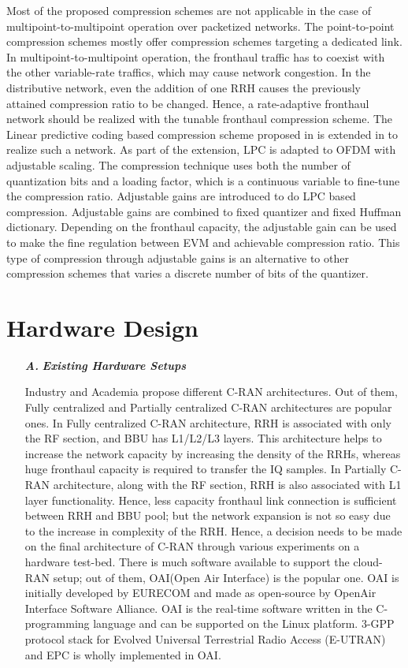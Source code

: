 \begin{multicols}{2}
\begin{itemize}
Most of the proposed compression schemes are not applicable in the case of multipoint-to-multipoint operation over packetized networks. The point-to-point compression schemes mostly offer compression schemes targeting a dedicated link. In multipoint-to-multipoint operation, the fronthaul traffic has to coexist with the other variable-rate traffics, which may cause network congestion. In the distributive network, even the addition of one RRH causes the previously attained compression ratio to be changed. Hence, a rate-adaptive fronthaul network should be realized with the tunable fronthaul compression scheme. The Linear predictive coding based compression scheme proposed in \cite{art3-key71} is extended in \cite{art3-key73} to realize such a network. As part of the extension, LPC is adapted to OFDM with adjustable scaling. The compression technique uses both the number of quantization bits and a loading factor, which is a continuous variable to fine-tune the compression ratio. Adjustable gains are introduced to do LPC based compression. Adjustable gains are combined to fixed quantizer and fixed Huffman dictionary. Depending on the fronthaul capacity, the adjustable gain can be used to make the fine regulation between EVM and achievable compression ratio. This type of compression through adjustable gains is an alternative to other compression schemes that varies a discrete number of bits of the quantizer.
\end{itemize}

\section{Hardware Design}\label{sect07}

\begin{itemize}
\item[{\textit{\textbf{ A.}}}] {\textit{\textbf{Existing Hardware Setups}}}

Industry and Academia propose different C-RAN architectures. Out of them, Fully centralized and Partially centralized C-RAN architectures are popular ones. In Fully centralized C-RAN architecture, RRH is associated with only the RF section, and BBU has L1/L2/L3 layers. This architecture helps to increase the network capacity by increasing the density of the RRHs, whereas huge fronthaul capacity is required to transfer the IQ samples. In Partially C-RAN architecture, along with the RF section, RRH is also associated with L1 layer functionality. Hence, less capacity fronthaul link connection is sufficient between RRH and BBU pool; but the network expansion is not so easy due to the increase in complexity of the RRH. Hence, a decision needs to be made on the final architecture of C-RAN through various experiments on a hardware test-bed. There is much software available to support the cloud-RAN setup; out of them, OAI(Open Air Interface) is the popular one. OAI is initially developed by EURECOM and made as open-source by OpenAir Interface Software Alliance. OAI is the real-time software written in the C-programming language and can be supported on the Linux platform. 3-GPP protocol stack for Evolved Universal Terrestrial Radio Access (E-UTRAN) and EPC is wholly implemented in OAI.


\end{itemize}
\end{multicols}
